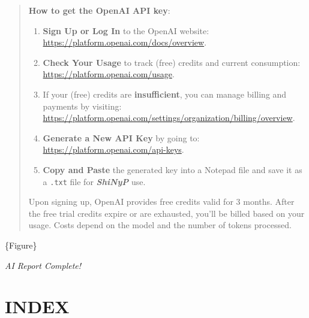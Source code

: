 \documentclass[
]{book}
\begin{document}
\begin{quote}
\textbf{How to get the OpenAI API key}:

\begin{enumerate}
\def\labelenumi{\arabic{enumi}.}
\item
  \textbf{Sign Up or Log In} to the OpenAI website: \url{https://platform.openai.com/docs/overview}.
\item
  \textbf{Check Your Usage} to track (free) credits and current consumption: \url{https://platform.openai.com/usage}.
\item
  If your (free) credits are \textbf{insufficient}, you can manage billing and payments by visiting: \url{https://platform.openai.com/settings/organization/billing/overview}.
\item
  \textbf{Generate a New API Key} by going to: \url{https://platform.openai.com/api-keys}.
\item
  \textbf{Copy and Paste} the generated key into a Notepad file and save it as a \texttt{.txt} file for {\textbf{\emph{ShiNyP}}} use.
\end{enumerate}

Upon signing up, OpenAI provides free credits valid for 3 months. After the free trial credits expire or are exhausted, you'll be billed based on your usage. Costs depend on the model and the number of tokens processed.
\end{quote}

\{Figure\}

\emph{AI Report Complete!}

\chapter{INDEX}\label{sec-index}
\end{document}
